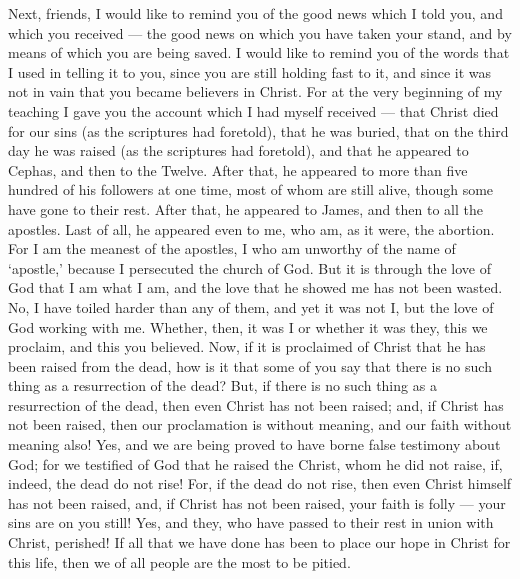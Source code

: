  Next, friends, I would like to remind you of the good news
which I told you, and which you received --- the good news on which you
have taken your stand,  and by means of which you are being
saved. I would like to remind you of the words that I used in telling it
to you, since you are still holding fast to it, and since it was not in
vain that you became believers in Christ.  For at the very
beginning of my teaching I gave you the account which I had myself
received --- that Christ died for our sins (as the scriptures had
foretold),  that he was buried, that on the third day he was
raised (as the scriptures had foretold),  and that he
appeared to Cephas, and then to the Twelve.  After that, he
appeared to more than five hundred of his followers at one time, most of
whom are still alive, though some have gone to their rest. 
After that, he appeared to James, and then to all the apostles.
 Last of all, he appeared even to me, who am, as it were,
the abortion.  For I am the meanest of the apostles, I who
am unworthy of the name of `apostle,' because I persecuted the church of
God.  But it is through the love of God that I am what I
am, and the love that he showed me has not been wasted. No, I have
toiled harder than any of them, and yet it was not I, but the love of
God working with me.  Whether, then, it was I or whether it
was they, this we proclaim, and this you believed.  Now, if
it is proclaimed of Christ that he has been raised from the dead, how is
it that some of you say that there is no such thing as a resurrection of
the dead?  But, if there is no such thing as a resurrection
of the dead, then even Christ has not been raised;  and, if
Christ has not been raised, then our proclamation is without meaning,
and our faith without meaning also!  Yes, and we are being
proved to have borne false testimony about God; for we testified of God
that he raised the Christ, whom he did not raise, if, indeed, the dead
do not rise!  For, if the dead do not rise, then even
Christ himself has not been raised,  and, if Christ has not
been raised, your faith is folly --- your sins are on you still!
 Yes, and they, who have passed to their rest in union with
Christ, perished!  If all that we have done has been to
place our hope in Christ for this life, then we of all people are the
most to be pitied.

